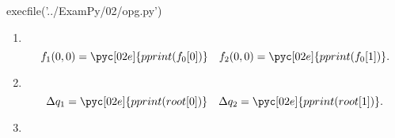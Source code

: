 \documentclass[../main.tex]{subfiles}
\begin{document}
\begin{pycode}[02e]
execfile('../ExamPy/02/opg.py')	
\end{pycode}

\begin{enumerate}
	\item \\
		\[
			f_1(0,0) = \pyc[02e]{pprint(f_0[0])}
			\quad
			f_2(0,0) = \pyc[02e]{pprint(f_0[1])}
		.\] 
	\item \\
		 \[
			 \Delta q_1 = \pyc[02e]{pprint(root[0])}
			 \quad
			 \Delta q_2 = \pyc[02e]{pprint(root[1])}
		.\] 
	\item \\


\end{enumerate}

\inputminted{python}{../ExamPy/02/opg.py}


	
\end{document}

